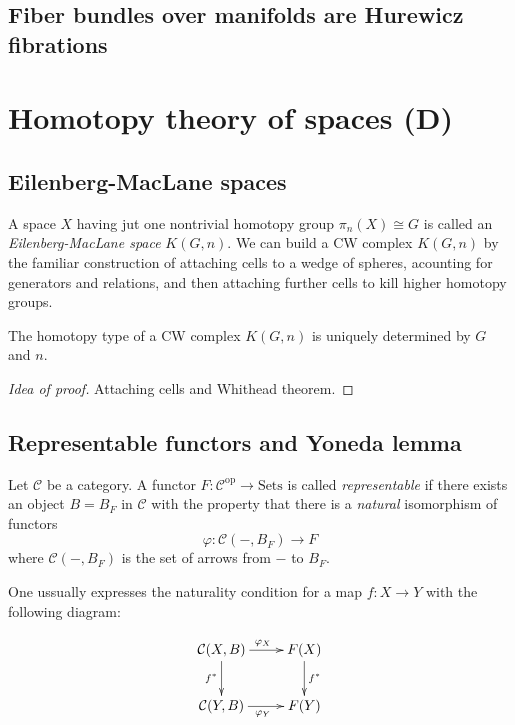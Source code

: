\subsection{Fiber bundles over manifolds are
Hurewicz fibrations}
\label{subsection-fiber-bundl-over-manif}

\section{Homotopy theory of spaces (D)}
\label{section-homotopy-theory-of-spaces-d}

\subsection{Eilenberg-MacLane spaces}
\label{subsection-eilenberg-maclane-spaces}
A space $X$ having jut one nontrivial
homotopy group $\pi_{n}(X)\cong G$ is called
an {\it Eilenberg-MacLane space} $K(G,n)$. We
can build a CW complex $K(G,n)$ by the
familiar construction of attaching cells to a
wedge of spheres, acounting for generators
and relations, and then attaching further
cells to kill higher homotopy groups.

\begin{proposition}[4.30]
\label{proposition-4-30}
	The homotopy type of a CW complex $K(G,n)$
	is uniquely determined by $G$ and $n$.
\end{proposition}
\begin{proof}[Idea of proof]
	Attaching cells and Whithead theorem.
\end{proof}

\subsection{Representable functors and Yoneda
lemma}
\label{subsection-repre-funct-yoned-lemma}

\begin{definition}
\label{definition-representable-functor}
	Let $\mathcal{C}$ be a category. A functor
	$F:\mathcal{C}^{\text{op}}\to \text{Sets}$
	is called {\it representable} if there
	exists an object $B=B_{F}$ in $\mathcal{C}$
	with the property that there is a
	\textit{natural} isomorphism of functors
	$$\varphi:\mathcal{C}(-,B_{F})\to F$$
	where $\mathcal{C}(-,B_{F})$ is the set of
	arrows from $-$ to $B_{F}$.

	One ussually expresses the naturality
	condition for a map $f:X\to Y$ with the
	following diagram:

	$$
	\xymatrix{
		\mathcal{C}(X,B)\ar[r]^{\varphi_{X}}\ar[d]
		_{f^{*}}
		&F(X)\ar[d]^{f^{*}}\\
		\mathcal{C}(Y,B)\ar[r]_{\varphi_{Y}}&F(Y)
	}
	$$
\end{definition}


